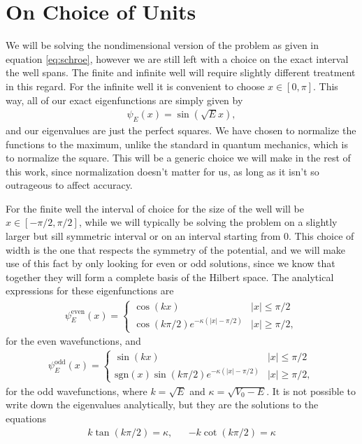 \documentclass[10pt,a4paper,twocolumn]{article}
\begin{document}
\section{On Choice of Units}

We will be solving the nondimensional version of the problem as given in equation \ref{eq:schroe}, however we are still left with a choice on the exact interval the well spans. The finite and infinite well will require slightly different treatment in this regard. For the infinite well it is convenient to choose $x \in [0, \pi]$. This way, all of our exact eigenfunctions are simply given by
%
\begin{align}
    \psi_E(x) = \sin \! \left( \sqrt{E} x \right),
\end{align}
%
and our eigenvalues are just the perfect squares. We have chosen to normalize the functions to the maximum, unlike the standard in quantum mechanics, which is to normalize the square. This will be a generic choice we will make in the rest of this work, since normalization doesn't matter for us, as long as it isn't so outrageous to affect accuracy.

For the finite well the interval of choice for the size of the well will be $x \in [-\pi/2, \pi/2]$, while we will typically be solving the problem on a slightly larger but sill symmetric interval or on an interval starting from $0$. This choice of width is the one that respects the symmetry of the potential, and we will make use of this fact by only looking for even or odd solutions, since we know that together they will form a complete basis of the Hilbert space. The analytical expressions for these eigenfunctions are
%
\begin{align}
    \psi_E^{\mathrm{even}}(x) = 
    \begin{cases}
        \cos(k x) & |x| \leq \pi/2\\
        \cos(k \pi/2) e^{-\kappa (|x| - \pi/2)} & |x| \geq \pi/2,
    \end{cases}
\end{align} 
%
for the even wavefunctions, and 
%
\begin{align}
    \psi_E^{\mathrm{odd}}(x) = 
    \begin{cases}
        \sin(k x) & |x| \leq \pi/2\\
        \mathrm{sgn}(x) \sin(k \pi/2) e^{-\kappa (|x| - \pi/2)} & |x| \geq \pi/2,
    \end{cases}
\end{align} 
%
for the odd wavefunctions, where $k = \sqrt{E}$ and $\kappa = \sqrt{V_0 -E}$. It is not possible to write down the eigenvalues analytically, but they are the solutions to the equations
%
\begin{align}
    &k \tan(k \pi/2) = \kappa,& &-k \cot(k \pi/2) = \kappa&
\end{align}
\end{document}
